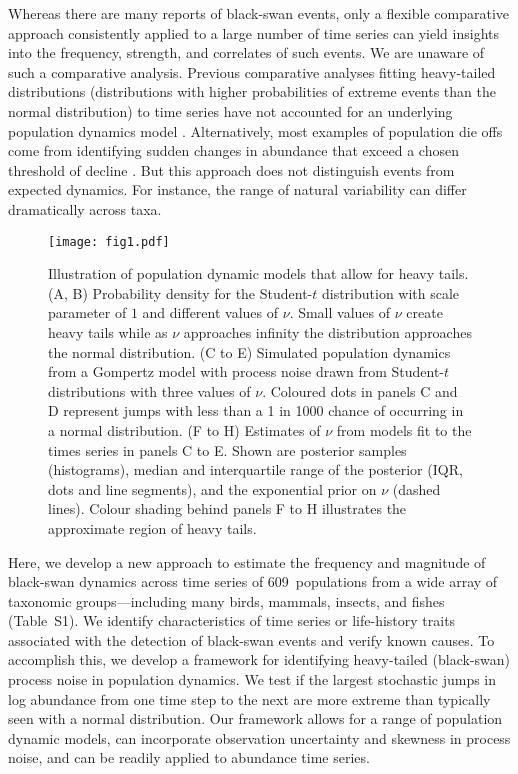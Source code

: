 \documentclass[9pt,twocolumn,twoside]{pnas-new}
\newcommand{\NPops}{609}
\begin{document}
Whereas there are many reports of black-swan events,
only a flexible comparative approach consistently applied
to a large number of time series can yield insights into the frequency, strength,
and correlates of such events.
We are unaware of such a comparative analysis.
Previous comparative analyses fitting
heavy-tailed distributions
(distributions with higher probabilities of extreme events
than the normal distribution)
to time series
have not accounted for an underlying population dynamics model
\cite{keitt1998, allen2001, halley2002, segura2013}.
Alternatively, most examples of population die offs come from identifying
sudden changes in abundance that exceed a chosen threshold of decline
\cite{young1994, gerber2001, reed2003, fey2015}.
But this approach
does not distinguish events from
expected dynamics.
For instance, the range of natural variability
can differ dramatically across taxa.

\begin{figure*}[htb]
\centering
\texttt{[image: fig1.pdf]}
\caption{Illustration of population dynamic models that allow for heavy
tails. (A, B) Probability density for the Student-$t$
distribution with scale parameter of $1$ and different values of \(\nu\). Small
values of \(\nu\) create heavy tails while as \(\nu\) approaches infinity the
distribution approaches the normal distribution. (C to E)
Simulated population dynamics from a Gompertz model with process noise drawn
from Student-$t$ distributions with three values of \(\nu\). Coloured dots in
panels C and D represent jumps with less than a 1 in 1000
chance of occurring in a normal distribution. (F to H)
Estimates of \(\nu\) from models fit to the times series in panels C to
E. Shown are posterior samples (histograms), median and interquartile
range of the posterior (IQR, dots and line segments), and the exponential prior
on \(\nu\) (dashed lines). Colour shading behind panels F to H
illustrates the approximate region of heavy tails.}
\label{fig:1}
\end{figure*}

Here, we develop a new approach to estimate the frequency and magnitude of
black-swan dynamics across time series of \NPops\ populations from a wide array of
taxonomic groups---including many  birds, mammals, insects, and fishes
(Table~S1). We identify characteristics of time series or
life-history traits associated with the detection of black-swan events and
verify known causes. To accomplish this, we develop a framework for identifying
heavy-tailed (black-swan) process noise in population dynamics.
We test if the largest stochastic jumps in log abundance from one time step to the next
are more extreme than typically seen with a normal distribution. Our framework
allows for a range of population dynamic models, can incorporate observation
uncertainty and skewness in process noise, and can be readily applied to
abundance time series.
\end{document}
